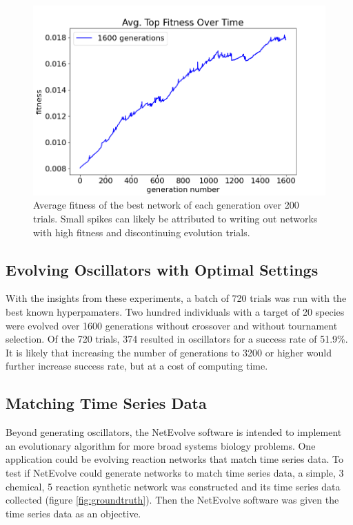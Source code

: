 \documentclass[12pt]{report}
\begin{document}
\begin{figure}
\centering
    \includegraphics[width=15cm]{images/1600_top_fitness.png}
    \caption[Average top fitness over 1600 generations]{Average fitness of the best network of each generation over 200 trials. Small spikes can likely be attributed to writing out networks with high fitness and discontinuing evolution trials.}
    \label{fig:1600_top_fitness}
\end{figure}


\subsection{Evolving Oscillators with Optimal Settings}
With the insights from these experiments, a batch of 720 trials was run with the best known hyperpamaters. Two hundred individuals with a target of 20 species were evolved over 1600 generations without crossover and without tournament selection. Of the 720 trials, 374 resulted in oscillators for a success rate of 51.9\%. It is likely that increasing the number of generations to 3200 or higher would further increase success rate, but at a cost of computing time.

\subsection{Matching Time Series Data}
Beyond generating oscillators, the NetEvolve software is intended to implement an evolutionary algorithm for more broad systems biology problems. One application could be evolving reaction networks that match time series data. To test if NetEvolve could generate networks to match time series data, a simple, 3 chemical, 5 reaction synthetic network was constructed and its time series data collected (figure \ref{fig:groundtruth}). Then the NetEvolve software was given the time series data as an objective. 
\end{document}
